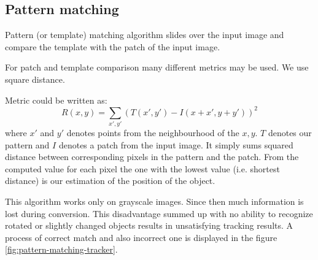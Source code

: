 \subsection {Pattern matching}
Pattern (or template) matching algorithm slides over the input image and
compare the template with the patch of the input image.

For patch and template comparison many different metrics may be used. We use
square distance.

Metric could be written as:
$$
R(x, y) =
\sum_{x', y'} (T(x', y') - I(x + x', y + y'))^2
$$
where $x'$ and $y'$ denotes points from the neighbourhood of the $x, y$. $T$
denotes our pattern and $I$ denotes a patch from the input image. It simply
sums squared distance between corresponding pixels in the pattern and the
patch. From the computed value for each pixel the one with the lowest value
(i.e. shortest distance) is our estimation of the position of the object.

This algorithm works only on grayscale images. Since then much information is
lost during conversion. This disadvantage summed up with no ability to
recognize rotated or slightly changed objects results in unsatisfying tracking
results. A process of correct match and also incorrect one is displayed in the
figure
\ref{fig:pattern-matching-tracker}.

